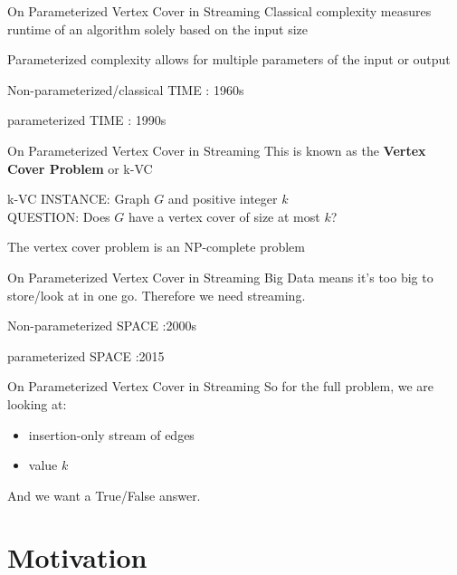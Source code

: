 \documentclass{beamer}
\begin{document}
\begin{frame}{On \alert{Parameterized} Vertex Cover in Streaming}
    Classical complexity measures runtime of an algorithm solely based on the input size

    Parameterized complexity allows for multiple parameters of the input or output

    Non-parameterized/classical TIME : 1960s

    parameterized TIME : 1990s
\end{frame}

\begin{frame}{On \alert{Parameterized Vertex Cover} in Streaming}
    This is known as the \textbf{Vertex Cover Problem} or k-VC

    \hfill

    \begin{alertblock}{k-VC}
        INSTANCE: Graph $G$ and positive integer $k$\\
        QUESTION: Does $G$ have a vertex cover of size at most $k$?\\
    \end{alertblock}

    \hfill

    The vertex cover problem is an NP-complete problem
\end{frame}

\begin{frame}{On Parameterized Vertex Cover in \alert{Streaming}}
    Big Data means it's too big to store/look at in one go. Therefore we need streaming.

    \hfill

    Non-parameterized SPACE :2000s

    parameterized SPACE :2015
\end{frame}

\begin{frame}{On \alert{Parameterized Vertex Cover in Streaming}}
    So for the full problem, we are looking at:

    \begin{itemize}
        \item insertion-only stream of edges
        \item value $k$
    \end{itemize}

    And we want a True/False answer.
\end{frame}

\section{Motivation}
\end{document}
